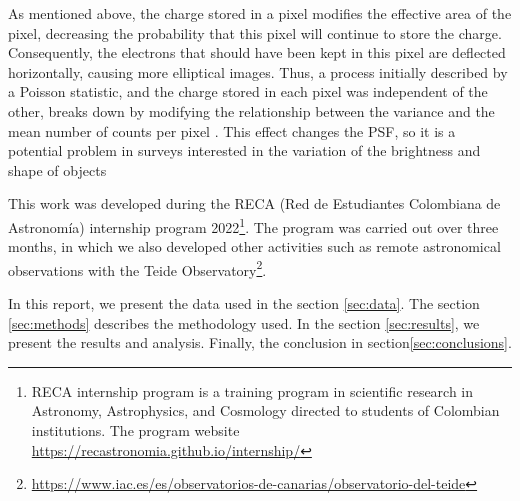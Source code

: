 As mentioned above, the charge stored in a pixel modifies the effective area of the pixel, decreasing the probability that this pixel will continue to store the charge. Consequently, the electrons that should have been kept in this pixel are deflected horizontally, causing more elliptical images. Thus, a process initially described by a Poisson statistic, and the charge stored in each pixel was independent of the other, breaks down by modifying the relationship between the variance and the mean number of counts per pixel \citep{walter2015brighter}. This effect changes the PSF, so it is a potential problem in surveys interested in the variation of the brightness and shape of objects \citep{coulton2018exploring}


\vspace{6mm}


This work was developed during the RECA (Red de Estudiantes Colombiana de Astronomía) internship program 2022\footnote{RECA internship program is a training program in scientific research in Astronomy, Astrophysics, and Cosmology directed to students of Colombian institutions. The program website \href{https://recastronomia.github.io/internship/}{https://recastronomia.github.io/internship/}}. The program was carried out over three months, in which we also developed other activities such as remote astronomical observations with the Teide Observatory\footnote{\href{https://www.iac.es/es/observatorios-de-canarias/observatorio-del-teide}{https://www.iac.es/es/observatorios-de-canarias/observatorio-del-teide}}.


In this report, we present the data used in the section \ref{sec:data}. The section \ref{sec:methods} describes the methodology used. In the section \ref{sec:results}, we present the results and analysis. Finally, the conclusion in section\ref{sec:conclusions}.